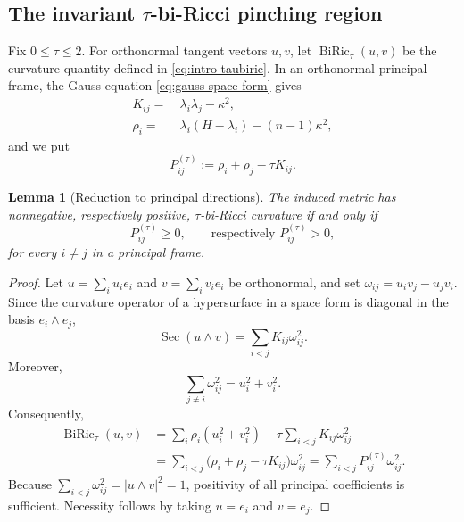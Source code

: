 \documentclass[11pt,reqno]{amsart}
\newtheorem{lemma}[proposition]{Lemma}
\theoremstyle{definition}
\theoremstyle{remark}
\numberwithin{equation}{section}
\begin{document}
\subsection{The invariant \texorpdfstring{$\tau$}{tau}-bi-Ricci pinching region}

Fix $0\leq\tau\leq2$. For orthonormal tangent vectors $u,v$, let
$\operatorname{BiRic}_{\tau}(u,v)$ be the curvature quantity defined in \eqref{eq:intro-taubiric}.  In an orthonormal principal frame, the Gauss equation \eqref{eq:gauss-space-form} gives
\begin{align}
K_{ij}=&~\lambda_i\lambda_j-\kappa^2 ,\label{s2.Kij}\\
\rho_i=&~\lambda_i(H-\lambda_i)-(n-1)\kappa^2, \label{s2.rhoi}
\end{align}
and we put
\begin{equation}\label{eq:Ptau-definition}
 P_{ij}^{(\tau)}
 :=\rho_i+\rho_j-\tau K_{ij}.
\end{equation}

\begin{lemma}[Reduction to principal directions]
The induced metric has nonnegative, respectively positive,
$\tau$-bi-Ricci curvature if and only if
\begin{equation*}
 P_{ij}^{(\tau)}\geq0,
 \qquad\text{respectively }P_{ij}^{(\tau)}>0,
\end{equation*}
for every $i\ne j$ in a principal frame.
\end{lemma}

\begin{proof}
Let $u=\sum_i u_i e_i$ and $v=\sum_i v_i e_i$ be orthonormal, and set
$\omega_{ij}=u_i v_j-u_j v_i$. Since the curvature operator of a hypersurface in a space form is diagonal in the basis $e_i\wedge e_j$,
\begin{equation*}
 \operatorname{Sec}(u\wedge v)
 =\sum_{i<j}K_{ij}\omega_{ij}^2.
\end{equation*}
Moreover,
\begin{equation*}
 \sum_{j\ne i}\omega_{ij}^2=u_i^2+v_i^2.
\end{equation*}
Consequently,
\begin{align*}
 \operatorname{BiRic}_{\tau}(u,v)
 &=\sum_i\rho_i(u_i^2+v_i^2)
   -\tau\sum_{i<j}K_{ij}\omega_{ij}^2\\
 &=\sum_{i<j}
   \bigl(\rho_i+\rho_j-\tau K_{ij}\bigr)\omega_{ij}^2
 =\sum_{i<j}P_{ij}^{(\tau)}\omega_{ij}^2.
\end{align*}
Because $\sum_{i<j}\omega_{ij}^2=|u\wedge v|^2=1$, positivity of all
principal coefficients is sufficient.  Necessity follows by taking
$u=e_i$ and $v=e_j$.
\end{proof}
\end{document}
